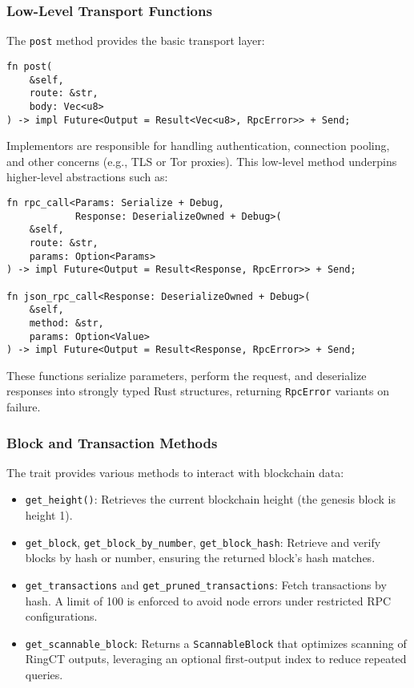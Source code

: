 \documentclass[12pt,a4paper]{article}
\begin{document}
\subsubsection{Low-Level Transport Functions}
\label{sec:monero-rpc-low-level}

The \texttt{post} method provides the basic transport layer:

\begin{verbatim}
fn post(
    &self,
    route: &str,
    body: Vec<u8>
) -> impl Future<Output = Result<Vec<u8>, RpcError>> + Send;
\end{verbatim}

Implementors are responsible for handling authentication, connection pooling, and other concerns
(e.g., TLS or Tor proxies). This low-level method underpins higher-level abstractions such as:

\begin{verbatim}
fn rpc_call<Params: Serialize + Debug,
            Response: DeserializeOwned + Debug>(
    &self,
    route: &str,
    params: Option<Params>
) -> impl Future<Output = Result<Response, RpcError>> + Send;

fn json_rpc_call<Response: DeserializeOwned + Debug>(
    &self,
    method: &str,
    params: Option<Value>
) -> impl Future<Output = Result<Response, RpcError>> + Send;
\end{verbatim}

These functions serialize parameters, perform the request, and deserialize responses into strongly
typed Rust structures, returning \texttt{RpcError} variants on failure.

\subsubsection{Block and Transaction Methods}
\label{sec:monero-rpc-block-transaction}

The trait provides various methods to interact with blockchain data:

\begin{itemize}
    \item \texttt{get\_height()}: Retrieves the current blockchain height (the genesis block is
    height 1).
    \item \texttt{get\_block}, \texttt{get\_block\_by\_number}, \texttt{get\_block\_hash}:
    Retrieve and verify blocks by hash or number, ensuring the returned block’s hash matches.
    \item \texttt{get\_transactions} and \texttt{get\_pruned\_transactions}: Fetch transactions by
    hash. A limit of 100 is enforced to avoid node errors under restricted RPC configurations.
    \item \texttt{get\_scannable\_block}: Returns a \texttt{ScannableBlock} that optimizes scanning
    of RingCT outputs, leveraging an optional first-output index to reduce repeated queries.
\end{itemize}
\end{document}
